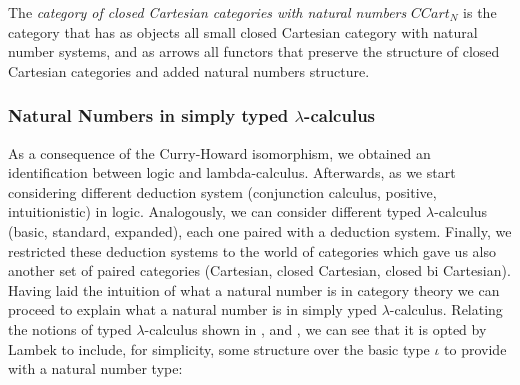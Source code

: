 \begin{definition}
  The \emph{category of closed Cartesian categories with natural numbers} $CCart_N$  is the category that has as objects all small closed Cartesian category with natural number systems, and as arrows all functors that preserve the structure of closed Cartesian categories and added natural numbers structure.\\
\end{definition}


\subsubsection{Natural Numbers in simply typed $\lambda$-calculus}\label{section:natural-revisited}

As a consequence of the Curry-Howard isomorphism, we obtained an identification between logic and lambda-calculus. Afterwards, as we start considering different deduction system  (conjunction calculus, positive, intuitionistic) in logic. Analogously, we can consider different typed $\lambda$-calculus (basic, standard, expanded), each one paired with a deduction system. Finally, we restricted these deduction systems to the world of categories which gave us also another set of paired categories (Cartesian, closed Cartesian, closed bi Cartesian). \\



Having laid the intuition of what a natural number is in category theory we can proceed to explain what a natural number is in simply yped $\lambda$-calculus. Relating the notions of typed $\lambda$-calculus shown in \cite[Section 10]{lambek1988introduction}, \cite[Section 6]{selinger2008lecture} and \cite[Section 10]{cardone2006history}, we can see that it is opted by Lambek to  include, for simplicity, some structure over the basic type $\iota$  to provide with a natural number type:


